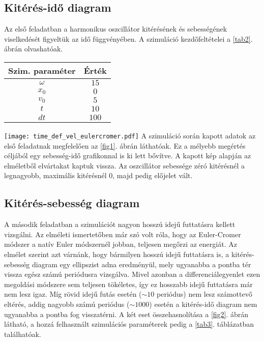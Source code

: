 \begin{multicols}{2}
\subsection{Kitérés-idő diagram}
Az első feladatban a harmonikus oszcillátor kitérésének és sebességének viselkedését figyeltük az idő függvényében. A szimuláció kezdőfeltételei a \ref{tab2}. ábrán olvashatóak.
\begin{center}
\begin{tabular}{c|c}
Szim. paraméter & Érték \\
\hline \hline
$\omega$ & $15$ \\
\hline
$x_{0}$ & $0$ \\
\hline
$v_{0}$ & $5$ \\
\hline
$t$ & $10$ \\
\hline
$dt$ & $100$ \\
\hline
\end{tabular}
\end{center}
\label{tab2}
\hfill \break \hfill \break
{\centering\texttt{[image: time\_def\_vel\_eulercromer.pdf]}}
\label{fig1}
\hfill \break \hfill \break
A szimuláció során kapott adatok az első feladatnak megfelelően az \ref{fig1}. ábrán láthatóak. Ez a mélyebb megértés céljából egy sebesség-idő grafikonnal is ki lett bővítve. A kapott kép alapján az elméletből elvártakat kaptuk vissza. Az oszcillátor sebessége zéró kitérésnél a legnagyobb, maximális kitérésnél $0$, majd pedig előjelet vált.

\subsection{Kitérés-sebesség diagram}
A második feladatban a szimulációt nagyon hosszú idejű futtatásra kellett vizsgálni. Az elméleti ismertetőben már szó volt róla, hogy az Euler-Cromer módszer a natív Euler módszernél jobban, teljesen megőrzi az energiát. Az elmélet szerint azt várnánk, hogy bármilyen hosszú idejű futtatásra is, a kitérés-sebesség diagram egy ellipszist adna eredményül, mely ugyanabba a pontba tér vissza egész számú periódusra vizsgálva. Mivel azonban a differenciálegyenlet ezen megoldási módszere sem teljesen tökéletes, így ez hosszabb idejű futtatásra már nem lesz igaz. Míg rövid idejű futás esetén ($\sim 10$ periódus) nem lesz számottevő eltérés, addig nagyobb számú periódus ($\sim 1000$) esetén a kitérés-idő diagram nem ugyanabba a pontba fog visszatérni. A két eset összehasnolítása a \ref{fig2}. ábrán látható, a hozzá felhasznált szimulációs paraméterek pedig a \ref{tab3}. táblázatban találhatóak.


\end{multicols}
